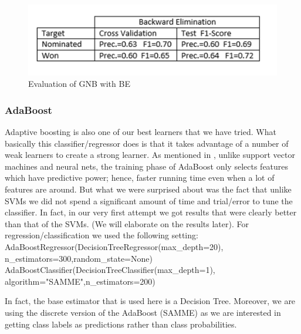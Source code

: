 \documentclass[journal,transmag]{IEEEtran}
\begin{document}
\begin{figure}
\includegraphics[scale=.35]{foj8.png}
 \caption{Evaluation of GNB with BE}
\label{fig_foj8}
\end{figure}

	\subsubsection{AdaBoost}
			\label{adaboost}
			Adaptive boosting is also one of our best learners that we have tried. What basically this classifier/regressor does is that it takes advantage of a number of weak learners to create a strong learner. As mentioned in \cite{adaboost}, unlike support vector machines and neural nets, the training phase of AdaBoost only selects features which have predictive power; hence, faster running time even when a lot of features are around. But what we were surprised about was the fact that unlike SVMs we did not spend a significant amount of time and trial/error to tune the classifier. In fact, in our very first attempt we got results that were clearly better than that of the SVMs. (We will elaborate on the results later). For regression/classification we used the following setting:\\
AdaBoostRegressor(DecisionTreeRegressor(max\_depth=20),\\
n\_estimators=300,random\_state=None)\\
AdaBoostClassifier(DecisionTreeClassifier(max\_depth=1),\\
algorithm="SAMME",n\_estimators=200)

In fact, the base estimator that is used here is a Decision Tree. Moreover, we are using the discrete version of the AdaBoost (SAMME) as we are interested in getting class labels as predictions rather than class probabilities.
			
\end{document}
